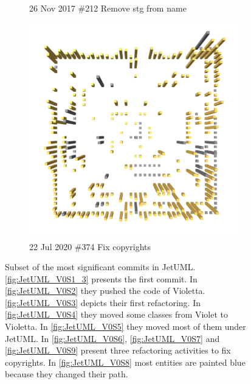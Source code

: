\begin{figure}[ht]
\begin{subfigure}{0.32\textwidth}
        \caption{26 Nov 2017 \linebreak  \#212 Remove stg from name} 
        \label{fig:JetUML_V0S8}
    \end{subfigure}
    \hspace*{\fill}
    \begin{subfigure}{0.32\textwidth}
        \includegraphics[width=\linewidth]{JetUML_V0S9.png}
        \caption{22 Jul 2020 \linebreak  \#374 Fix copyrights} 
        \label{fig:JetUML_V0S9}
    \end{subfigure}
    \hspace*{\fill}
    \medskip
    \caption{
        Subset of the most significant commits in JetUML. \autoref{fig:JetUML_V0S1_3} presents the first commit. In \autoref{fig:JetUML_V0S2} they pushed the code of Violetta. \autoref{fig:JetUML_V0S3} depicts their first refactoring. In \autoref{fig:JetUML_V0S4} they moved some classes from Violet to Violetta. In \autoref{fig:JetUML_V0S5} they moved most of them under JetUML. In \autoref{fig:JetUML_V0S6}, \autoref{fig:JetUML_V0S7} and \autoref{fig:JetUML_V0S9} present three refactoring activities to fix copyrights. In \autoref{fig:JetUML_V0S8} most entities are painted blue because they changed their path.} 
    \label{fig:JetUML_V0}
\end{figure}

